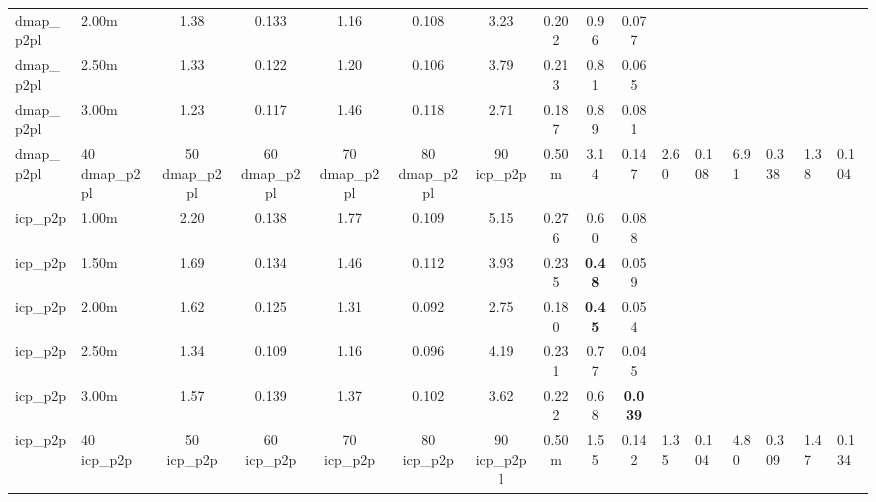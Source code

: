 \begin{tabular}{llcccccccc}
dmap\_p2pl & 2.00m & 1.38 & 0.133 & 1.16 & 0.108 & 3.23 & 0.202 & 0.96 & 0.077 \\
dmap\_p2pl & 2.50m & 1.33 & 0.122 & 1.20 & 0.106 & 3.79 & 0.213 & 0.81 & 0.065 \\
dmap\_p2pl & 3.00m & 1.23 & 0.117 & 1.46 & 0.118 & 2.71 & 0.187 & 0.89 & 0.081 \\
dmap\_p2pl & 40%
dmap\_p2pl & 50%
dmap\_p2pl & 60%
dmap\_p2pl & 70%
dmap\_p2pl & 80%
dmap\_p2pl & 90%
\midrule
icp\_p2p & 0.50m & 3.14 & 0.147 & 2.60 & 0.108 & 6.91 & 0.338 & 1.38 & 0.104 \\
icp\_p2p & 1.00m & 2.20 & 0.138 & 1.77 & 0.109 & 5.15 & 0.276 & 0.60 & 0.088 \\
icp\_p2p & 1.50m & 1.69 & 0.134 & 1.46 & 0.112 & 3.93 & 0.235 & \bfseries 0.48 & 0.059 \\
icp\_p2p & 2.00m & 1.62 & 0.125 & 1.31 & 0.092 & 2.75 & 0.180 & \bfseries 0.45 & 0.054 \\
icp\_p2p & 2.50m & 1.34 & 0.109 & 1.16 & 0.096 & 4.19 & 0.231 & 0.77 & 0.045 \\
icp\_p2p & 3.00m & 1.57 & 0.139 & 1.37 & 0.102 & 3.62 & 0.222 & 0.68 & \bfseries 0.039 \\
icp\_p2p & 40%
icp\_p2p & 50%
icp\_p2p & 60%
icp\_p2p & 70%
icp\_p2p & 80%
icp\_p2p & 90%
\midrule
icp\_p2pl & 0.50m & 1.55 & 0.142 & 1.35 & 0.104 & 4.80 & 0.309 & 1.47 & 0.134 \\

\end{tabular}
